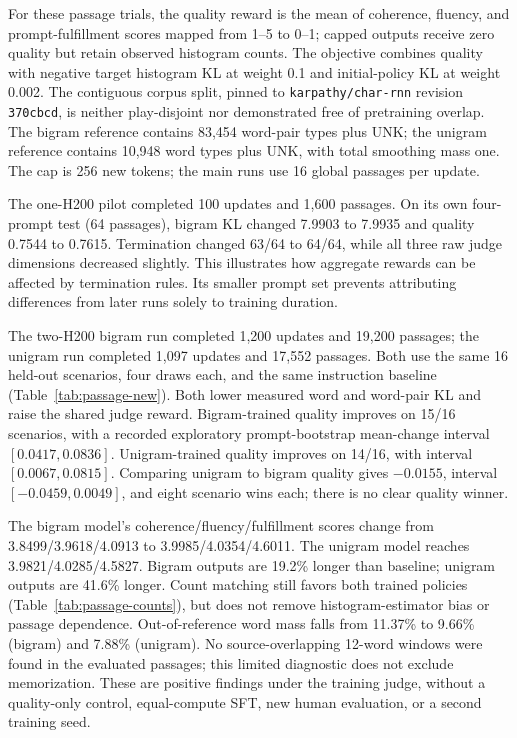 For these passage trials, the quality reward is the mean of coherence,
fluency, and prompt-fulfillment scores mapped from 1--5 to 0--1; capped
outputs receive zero quality but retain observed histogram counts. The
objective combines quality with negative target histogram KL at weight
0.1 and initial-policy KL at weight 0.002. The contiguous corpus split,
pinned to \texttt{karpathy/char-rnn} revision \texttt{370cbcd}, is neither
play-disjoint nor demonstrated free of pretraining overlap. The bigram
reference contains 83,454 word-pair types plus UNK; the unigram reference
contains 10,948 word types plus UNK, with total smoothing mass one.
The cap is 256 new tokens; the main runs use 16 global passages per update.

The one-H200 pilot completed 100 updates and 1,600 passages. On its own
four-prompt test (64 passages), bigram KL changed 7.9903 to 7.9935 and
quality 0.7544 to 0.7615. Termination changed 63/64 to 64/64, while all
three raw judge dimensions decreased slightly. This illustrates how
aggregate rewards can be affected by termination rules. Its smaller
prompt set prevents attributing differences from later runs solely to
training duration.

The two-H200 bigram run completed 1,200 updates and 19,200 passages;
the unigram run completed 1,097 updates and 17,552 passages. Both use
the same 16 held-out scenarios, four draws each, and the same instruction
baseline (Table~\ref{tab:passage-new}). Both lower measured word and
word-pair KL and raise the shared judge reward. Bigram-trained quality
improves on 15/16 scenarios, with a recorded exploratory prompt-bootstrap
mean-change interval $[0.0417,0.0836]$. Unigram-trained quality improves
on 14/16, with interval $[0.0067,0.0815]$. Comparing unigram to bigram
quality gives $-0.0155$, interval $[-0.0459,0.0049]$, and eight scenario
wins each; there is no clear quality winner.


The bigram model's coherence/fluency/fulfillment scores change from
3.8499/3.9618/4.0913 to 3.9985/4.0354/4.6011. The unigram model reaches
3.9821/4.0285/4.5827. Bigram outputs are 19.2\% longer than baseline;
unigram outputs are 41.6\% longer. Count matching still favors both
trained policies (Table~\ref{tab:passage-counts}), but does not remove
histogram-estimator bias or passage dependence. Out-of-reference word
mass falls from 11.37\% to 9.66\% (bigram) and 7.88\% (unigram).
No source-overlapping 12-word windows were found in the evaluated
passages; this limited diagnostic does not exclude memorization.
These are positive findings under the training judge, without a
quality-only control, equal-compute SFT, new human evaluation, or a
second training seed.


